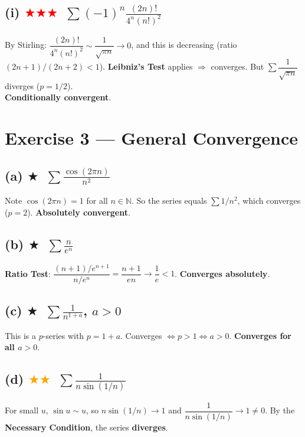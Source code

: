 \documentclass[12pt,a4paper]{article}
\newcommand{\easy}{\textcolor{green!60!black}{$\bigstar$}}
\newcommand{\medium}{\textcolor{orange}{$\bigstar\bigstar$}}
\newcommand{\hard}{\textcolor{red}{$\bigstar\bigstar\bigstar$}}
\begin{document}
\subsection*{(i) \hard\ $\displaystyle\sum(-1)^n\frac{(2n)!}{4^n(n!)^2}$}

By Stirling: $\dfrac{(2n)!}{4^n(n!)^2}\sim\dfrac{1}{\sqrt{\pi n}}\to 0$, and this is decreasing (ratio $(2n+1)/(2n+2)<1$).
\textbf{Leibniz's Test} applies $\Rightarrow$ converges.  But $\sum\dfrac{1}{\sqrt{\pi n}}$ diverges ($p=1/2$).\\
\textbf{Conditionally convergent}.

\section*{Exercise 3 — General Convergence}

\subsection*{(a) \easy\ $\displaystyle\sum\frac{\cos(2\pi n)}{n^2}$}

Note $\cos(2\pi n)=1$ for all $n\in\mathbb{N}$.  So the series equals $\sum 1/n^2$, which converges ($p=2$).  \textbf{Absolutely convergent}.

\subsection*{(b) \easy\ $\displaystyle\sum\frac{n}{e^n}$}

\textbf{Ratio Test}: $\dfrac{(n+1)/e^{n+1}}{n/e^n}=\dfrac{n+1}{en}\to\dfrac{1}{e}<1$.  \textbf{Converges absolutely}.

\subsection*{(c) \easy\ $\displaystyle\sum\frac{1}{n^{1+a}}$, $a>0$}

This is a $p$-series with $p=1+a$.  Converges $\Longleftrightarrow p>1\Longleftrightarrow a>0$. \textbf{Converges for all $a>0$}.

\subsection*{(d) \medium\ $\displaystyle\sum\frac{1}{n\sin(1/n)}$}

For small $u$, $\sin u\sim u$, so $n\sin(1/n)\to 1$ and $\dfrac{1}{n\sin(1/n)}\to 1\neq 0$.
By the \textbf{Necessary Condition}, the series \textbf{diverges}.
\end{document}
